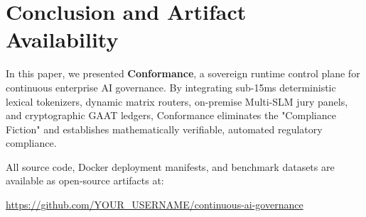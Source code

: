 \documentclass[conference,10pt]{IEEEtran}
\begin{document}
\section{Conclusion and Artifact Availability}
\label{sec:conclusion}

In this paper, we presented \textbf{Conformance}, a sovereign runtime control plane for continuous enterprise AI governance. By integrating sub-15ms deterministic lexical tokenizers, dynamic matrix routers, on-premise Multi-SLM jury panels, and cryptographic GAAT ledgers, Conformance eliminates the "Compliance Fiction" and establishes mathematically verifiable, automated regulatory compliance. 

All source code, Docker deployment manifests, and benchmark datasets are available as open-source artifacts at:
\begin{center}
\url{https://github.com/YOUR_USERNAME/continuous-ai-governance}
\end{center}



\end{document}
